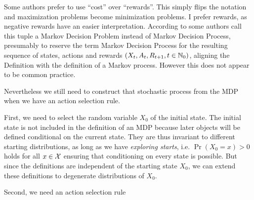 Some authors prefer to use ``cost'' over ``rewards''. This simply flips the notation and maximization problems become minimization problems. I prefer rewards, as negative rewards have an easier interpretation.
According to \textcite{putermanMarkovDecisionProcesses2005} some authors call this tuple a Markov Decision Problem instead of Markov Decision Process, presumably to reserve the term Markov Decision Process for the resulting sequence of states, actions and rewards \((X_t,A_t,R_{t+1},t\in\mathbb{N}_0)\), aligning the Definition with the definition of a Markov process. However this does not appear to be common practice.

Nevertheless we still need to construct that stochastic process from the MDP when we have an action selection rule. 

First, we need to select the random variable \(X_0\) of the initial state. The initial state is not included in the definition of an MDP because later objects will be defined conditional on the current state. They are thus invariant to different starting distributions, as long as we have \emph{exploring starts}, i.e. \(\Pr(X_0=x)>0\) holds for all \(x\in\mathcal{X}\) ensuring that conditioning on every state is possible. But since the definitions are independent of the starting state \(X_0\), we can extend these definitions to degenerate distributions of \(X_0\). 

Second, we need an action selection rule

